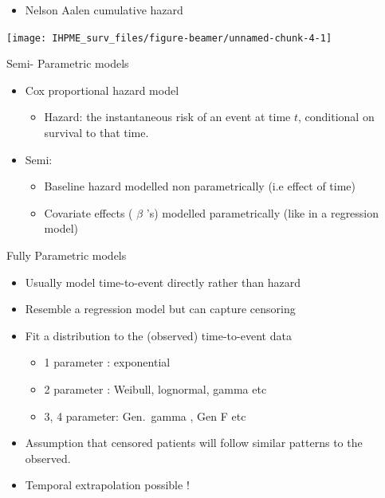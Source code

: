 \documentclass[
  ignorenonframetext,
]{beamer}
\providecommand{\tightlist}{%
  \setlength{\itemsep}{0pt}\setlength{\parskip}{0pt}}
\begin{document}
\begin{frame}

\begin{itemize}
\tightlist
\item
  Nelson Aalen cumulative hazard
\end{itemize}

\texttt{[image: IHPME\_surv\_files/figure-beamer/unnamed-chunk-4-1]}

\end{frame}

\begin{frame}{Semi- Parametric models}
\protect\hypertarget{semi--parametric-models}{}

\begin{itemize}
\tightlist
\item
  Cox proportional hazard model

  \begin{itemize}
  \tightlist
  \item
    Hazard: the instantaneous risk of an event at time \(t\),
    conditional on survival to that time.
  \end{itemize}
\item
  Semi:

  \begin{itemize}
  \tightlist
  \item
    Baseline hazard modelled non parametrically (i.e effect of time)
  \item
    Covariate effects ( \(\beta\) 's) modelled parametrically (like in a
    regression model)
  \end{itemize}
\end{itemize}

\end{frame}

\begin{frame}{Fully Parametric models}
\protect\hypertarget{fully-parametric-models}{}

\begin{itemize}
\tightlist
\item
  Usually model time-to-event directly rather than hazard
\item
  Resemble a regression model but can capture censoring
\item
  Fit a distribution to the (observed) time-to-event data

  \begin{itemize}
  \tightlist
  \item
    1 parameter : exponential
  \item
    2 parameter : Weibull, lognormal, gamma etc
  \item
    3, 4 parameter: Gen.~gamma , Gen F etc
  \end{itemize}
\item
  Assumption that censored patients will follow similar patterns to the
  observed.
\item
  Temporal extrapolation possible !
\end{itemize}

\end{frame}
\end{document}
